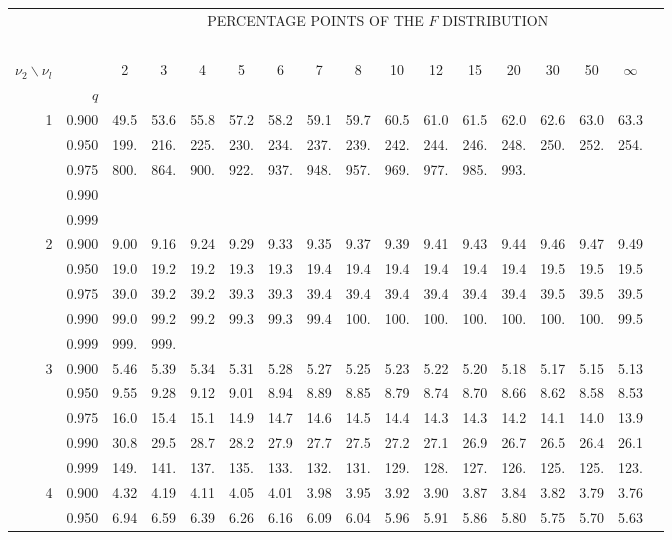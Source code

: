 {\begin{center}
\begin{tabular}{rrr@{\,}r@{\,}r@{\,}r@{\,}r@{\,}r@{\,}r@{\,}r
                   @{\,}r@{\,}r@{\,}r@{\,}r@{\,}r@{\,}r@{\,}r}
&&\multicolumn{14}{c}{PERCENTAGE POINTS OF THE $F$ DISTRIBUTION}\\
\ \\
$\nu_2\backslash\nu_l$ & & 
\multicolumn{1}{c}{2} &\multicolumn{1}{c}{3} &
\multicolumn{1}{c}{4} &\multicolumn{1}{c}{5} &
\multicolumn{1}{c}{6} &\multicolumn{1}{c}{7} &
\multicolumn{1}{c}{8} &\multicolumn{1}{c}{10}&
\multicolumn{1}{c}{12}&\multicolumn{1}{c}{15}&
\multicolumn{1}{c}{20}&\multicolumn{1}{c}{30}&
\multicolumn{1}{c}{50}&\multicolumn{1}{c}{$\infty$}\\
& $q$ \\
1&0.900&49.5&53.6&55.8&57.2&58.2&59.1&59.7&60.5&61.0&61.5&62.0&62.6&63.0&63.3\\
 &0.950&199.&216.&225.&230.&234.&237.&239.&242.&244.&246.&248.&250.&252.&254.\\
 &0.975&800.&864.&900.&922.&937.&948.&957.&969.&977.&985.&993.\\
 &0.990\\
 &0.999\\
2&0.900&9.00&9.16&9.24&9.29&9.33&9.35&9.37&9.39&9.41&9.43&9.44&9.46&9.47&9.49\\ 
 &0.950&19.0&19.2&19.2&19.3&19.3&19.4&19.4&19.4&19.4&19.4&19.4&19.5&19.5&19.5\\
 &0.975&39.0&39.2&39.2&39.3&39.3&39.4&39.4&39.4&39.4&39.4&39.4&39.5&39.5&39.5\\
 &0.990&99.0&99.2&99.2&99.3&99.3&99.4&100.&100.&100.&100.&100.&100.&100.&99.5\\
 &0.999&999.&999.\\
3&0.900&5.46&5.39&5.34&5.31&5.28&5.27&5.25&5.23&5.22&5.20&5.18&5.17&5.15&5.13\\
 &0.950&9.55&9.28&9.12&9.01&8.94&8.89&8.85&8.79&8.74&8.70&8.66&8.62&8.58&8.53\\
 &0.975&16.0&15.4&15.1&14.9&14.7&14.6&14.5&14.4&14.3&14.3&14.2&14.1&14.0&13.9\\
 &0.990&30.8&29.5&28.7&28.2&27.9&27.7&27.5&27.2&27.1&26.9&26.7&26.5&26.4&26.1\\
 &0.999&149.&141.&137.&135.&133.&132.&131.&129.&128.&127.&126.&125.&125.&123.\\
4&0.900&4.32&4.19&4.11&4.05&4.01&3.98&3.95&3.92&3.90&3.87&3.84&3.82&3.79&3.76\\
 &0.950&6.94&6.59&6.39&6.26&6.16&6.09&6.04&5.96&5.91&5.86&5.80&5.75&5.70&5.63\\

\end{tabular}
\end{center}}
